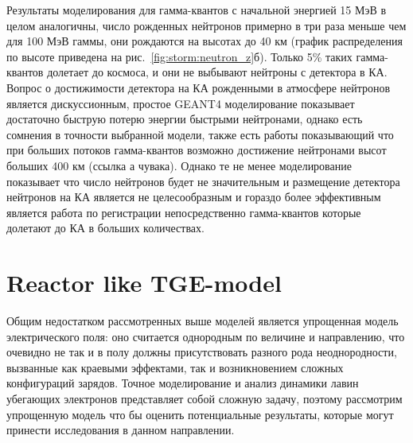 Результаты моделирования для гамма-квантов с начальной энергией 15 МэВ в целом аналогичны, число рожденных нейтронов примерно в три раза меньше чем для 100 МэВ гаммы, они рождаются на высотах до 40 км (график распределения по высоте приведена на рис.~\ref{fig:storm:neutron_z}б). Только 5\% таких гамма-квантов долетает до космоса, и они не выбывают нейтроны с детектора в КА. Вопрос о достижимости детектора на КА рожденными в атмосфере нейтронов  является дискуссионным, простое GEANT4 моделирование показывает достаточно быструю потерю энергии быстрыми нейтронами, однако есть сомнения в точности выбранной модели, также есть работы показывающий что при больших потоков гамма-квантов возможно достижение нейтронами высот больших 400 км (ссылка а чувака). Однако те не менее моделирование показывает что число нейтронов будет не значительным и размещение детектора нейтронов на КА является не целесообразным и гораздо более эффективным является работа по  регистрации непосредственно гамма-квантов которые долетают до КА в больших количествах.


\section{Reactor like TGE-model}\label{sec:thunderstorm/reactor}

Общим недостатком рассмотренных выше моделей является упрощенная модель электрического поля: оно считается однородным по величине и направлению, что очевидно не так и в полу должны присутствовать разного рода неоднородности, вызванные как краевыми эффектами, так и возникновением сложных конфигураций зарядов. Точное моделирование и анализ динамики лавин убегающих электронов представляет собой сложную задачу, поэтому рассмотрим упрощенную модель что бы оценить потенциальные результаты, которые могут принести исследования в данном направлении. 

